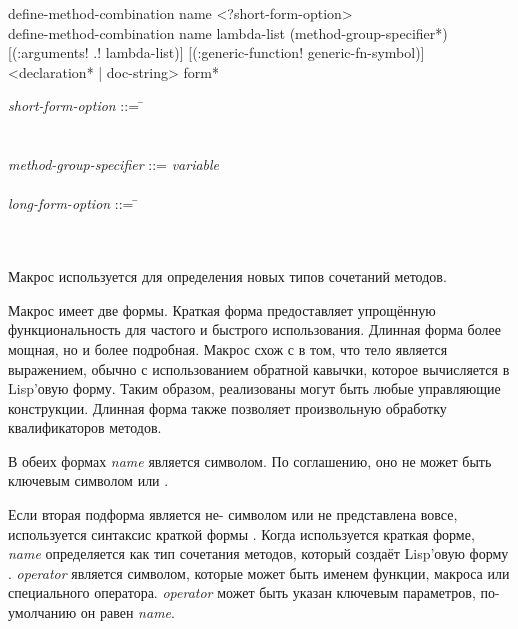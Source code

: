 \begin{defmac}
define-method-combination name <?short-form-option> \\
define-method-combination name lambda-list
    ({method-group-specifier}*)
    [(\!:arguments! \!.! lambda-list)]
    [(\!:generic-function! generic-fn-symbol)]
    <{declaration}* | doc-string>
    {form}*

\begin{tabbing}
\emph{short-form-option} ::= \= \\
\Mor~ \\
\Mor~  \\
\emph{method-group-specifier} ::= \cd{(}\=\emph{variable}
     \\
\>\cd{)} \\
\emph{long-form-option} ::= \= \\
\Mor~ \\
\Mor~
\end{tabbing}
Макрос  используется для определения новых типов
сочетаний методов.

Макрос  имеет две формы. Краткая форма
предоставляет упрощённую функциональность для частого и быстрого
использования. Длинная форма более мощная, но и более подробная. Макрос схож с
 в том, что тело является выражением, обычно с использованием
обратной кавычки, которое вычисляется в Lisp'овую форму. Таким образом,
реализованы могут быть любые управляющие конструкции. Длинная форма также
позволяет произвольную обработку квалификаторов методов.

В обеих формах \emph{name} является символом. По соглашению, оно не может быть
ключевым символом или .

Если вторая подформа является не- символом или не представлена вовсе,
используется синтаксис краткой формы .
Когда используется краткая форме, \emph{name} определяется как тип сочетания
методов, который создаёт Lisp'овую форму . \emph{operator} является символом, которые
может быть именем функции, макроса или специального оператора. \emph{operator}
может быть указан ключевым параметров, по-умолчанию он равен \emph{name}.


\end{defmac}
